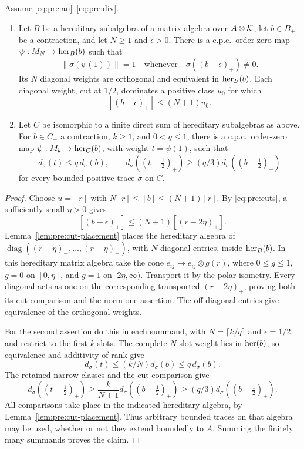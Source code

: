 \begin{lemma}
\label{lem:placement}
Assume \eqref{eq:pre:au}--\eqref{eq:pre:div}.
\begin{enumerate}
\item Let \(B\) be a hereditary subalgebra of a matrix algebra over
\(A\otimes\mathcal K\), let \(b\in B_+\) be a contraction, and let \(N\ge1\)
and \(\epsilon>0\). There is a c.p.c.\ order-zero map
\(\psi:M_N\to\operatorname{her}_B(b)\) such that
\[
 \|\sigma(\psi(1))\|=1
 \quad\text{whenever}\quad
 \sigma((b-\epsilon)_+)\ne0.
\]
Its \(N\) diagonal weights are orthogonal and equivalent in
\(\operatorname{her}_B(b)\). Each diagonal weight, cut at \(1/2\), dominates a
positive class \(u_0\) for which
\[
 [(b-\epsilon)_+]\le(N+1)u_0.
\]
\item Let \(C\) be isomorphic to a finite direct sum of hereditary
subalgebras as above. For \(b\in C_+\) a contraction, \(k\ge1\), and
\(0<q\le1\), there is a c.p.c.\ order-zero map
\(\psi:M_k\to\operatorname{her}_C(b)\), with weight \(t=\psi(1)\), such that
\begin{equation}
\label{eq:pre:P}
 d_\sigma(t)\le q\,d_\sigma(b),\qquad
 d_\sigma((t-\tfrac12)_+)
       \ge(q/3)d_\sigma((b-\tfrac12)_+)
\end{equation}
for every bounded positive trace \(\sigma\) on \(C\).
\end{enumerate}
\end{lemma}

\begin{proof}
Choose \(u=[r]\) with \(N[r]\le[b]\le(N+1)[r]\).
By \eqref{eq:pre:cuts}, a sufficiently small \(\eta>0\) gives
\[
 [(b-\epsilon)_+]\le(N+1)[(r-2\eta)_+].
\]
Lemma~\ref{lem:pre:cut-placement} places the hereditary algebra of
\(\operatorname{diag}((r-\eta)_+,\ldots,(r-\eta)_+)\), with \(N\)
diagonal entries, inside \(\operatorname{her}_B(b)\). In this hereditary matrix
algebra take the cone \(e_{ij}\mapsto e_{ij}\otimes g(r)\), where
\(0\le g\le1\), \(g=0\) on \([0,\eta]\), and \(g=1\) on
\([2\eta,\infty)\). Transport it by the polar isometry.
Every diagonal acts as one on the corresponding transported
\((r-2\eta)_+\), proving both its cut comparison and the norm-one
assertion. The off-diagonal entries give equivalence of the
orthogonal weights.

For the second assertion do this in each summand, with
\(N=\lceil k/q\rceil\) and \(\epsilon=1/2\), and restrict to the first
\(k\) slots. The complete \(N\)-slot weight lies in \(\operatorname{her}(b)\),
so equivalence and additivity of rank give
\[
 d_\sigma(t)\le(k/N)d_\sigma(b)\le q\,d_\sigma(b).
\]
The retained narrow classes and the cut comparison give
\[
 d_\sigma((t-\tfrac12)_+)
 \ge\frac{k}{N+1}d_\sigma((b-\tfrac12)_+)
 \ge(q/3)d_\sigma((b-\tfrac12)_+).
\]
All comparisons take place in the indicated hereditary algebra,
by Lemma~\ref{lem:pre:cut-placement}. Thus arbitrary bounded traces
on that algebra may be used, whether or not they extend boundedly
to \(A\). Summing the finitely many summands proves the claim.
\end{proof}

